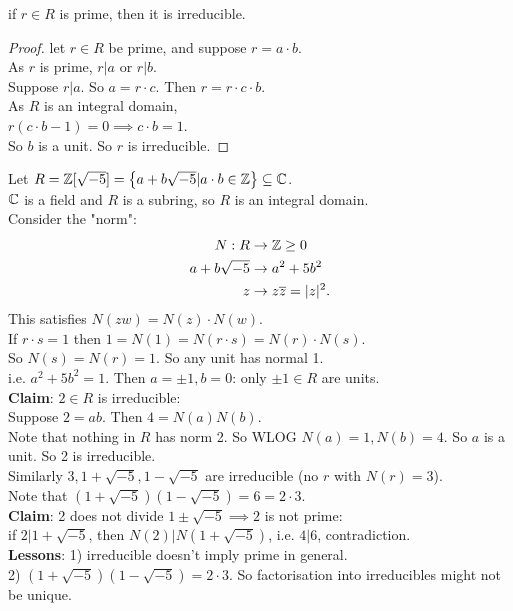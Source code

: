 \documentclass[a4paper]{article}
\begin{document}
\begin{lemma}
if $r\in R$ is prime, then it is irreducible.
\begin{proof}
let $r\in R$ be prime, and suppose $r=a\cdot b$.\\
As $r$ is prime, $r|a$ or $r|b$.\\
Suppose $r|a$. So $a=r\cdot c$. Then $r=r\cdot c\cdot b$.\\
As $R$ is an integral domain, \\
$r\left(c\cdot b-1\right)=0 \implies c\cdot b=1$.\\
So $b$ is a unit. So $r$ is irreducible.
\end{proof}
\end{lemma}

\begin{eg}
Let $R=\mathbb{Z}[\sqrt{-5}]=\left\{a+b\sqrt{-5}|a\cdot b\in\mathbb{Z}\right\}\subseteq \mathbb{C}$.\\
$\mathbb{C}$ is a field and $R$ is a subring, so $R$ is an integral domain.\\
Consider the "norm":\\
\begin{equation*}
\begin{aligned}
N:R &\to \mathbb{Z} \geq 0\\
a+b\sqrt{-5} &\to a^2+5b^2\\
z &\to z\overline{z}=|z|^2.
\end{aligned}
\end{equation*}
This satisfies $N\left(zw\right)=N\left(z\right)\cdot N\left(w\right)$.\\
If $r\cdot s=1$ then $1=N\left(1\right)=N\left(r\cdot s\right)=N\left(r\right)\cdot N\left(s\right)$.\\
So $N\left(s\right)=N\left(r\right)=1$. So any unit has normal 1.\\
i.e. $a^2+5b^2=1$. Then $a=\pm 1, b=0$: only $\pm 1\in R$ are units.\\
\textbf{Claim}: $2\in R$ is irreducible:\\
Suppose $2=ab$. Then $4=N\left(a\right) N\left(b\right)$.\\
Note that nothing in $R$ has norm 2. So WLOG $N\left(a\right)=1,N\left(b\right)=4$. So $a$ is a unit. So 2 is irreducible.\\
Similarly $3,1+\sqrt{-5},1-\sqrt{-5}$ are irreducible (no $r$ with $N\left(r\right)=3$).\\
Note that $\left(1+\sqrt{-5}\right)\left(1-\sqrt{-5}\right)=6=2\cdot 3$.\\
\textbf{Claim}: 2 does not divide $1 \pm \sqrt{-5} \implies 2$ is not prime:\\
if $2|1+\sqrt{-5}$, then $N\left(2\right)|N\left(1+\sqrt{-5}\right)$, i.e. $4|6$, contradiction.\\
\textbf{Lessons}: 1) irreducible doesn't imply prime in general.\\
2) $\left(1+\sqrt{-5}\right)\left(1-\sqrt{-5}\right) = 2\cdot 3$. So factorisation into irreducibles might not be unique.
\end{eg}
\end{document}
